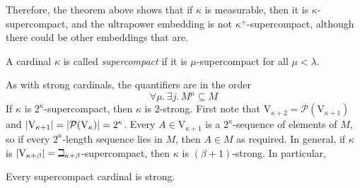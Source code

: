 Therefore, the theorem above shows that if \( \kappa \) is measurable, then it is \( \kappa \)-supercompact, and the ultrapower embedding is not \( \kappa^+ \)-supercompact, although there could be other embeddings that are.
\begin{definition}
    A cardinal \( \kappa \) is called \emph{supercompact} if it is \( \mu \)-supercompact for all \( \mu < \lambda \).
\end{definition}
As with strong cardinals, the quantifiers are in the order
\[ \forall \mu.\, \exists j.\, M^\mu \subseteq M \]
If \( \kappa \) is \( 2^\kappa \)-supercompact, then \( \kappa \) is \( 2 \)-strong.
First note that \( \mathrm{V}_{\kappa + 2} = \mathcal P(\mathrm{V}_{\kappa + 1}) \) and \( \abs{\mathrm{V}_{\kappa + 1}} = \abs{\mathcal P(\mathrm{V}_\kappa)} = 2^\kappa \).
Every \( A \in \mathrm{V}_{\kappa + 1} \) is a \( 2^\kappa \)-sequence of elements of \( M \), so if every \( 2^\kappa \)-length sequence lies in \( M \), then \( A \in M \) as required.
In general, if \( \kappa \) is \( \abs{\mathrm{V}_{\kappa + \beta}} = \beth_{\kappa + \beta} \)-supercompact, then \( \kappa \) is \( (\beta + 1) \)-strong.
In particular,
\begin{corollary}
    Every supercompact cardinal is strong.
\end{corollary}

